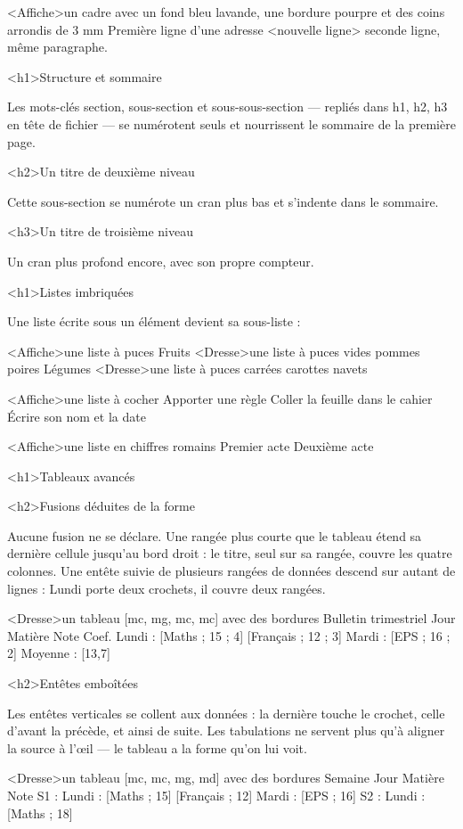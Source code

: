 \documentclass[marges=2, taille=11]{texecole}
\begin{document}
<Affiche>un cadre avec un fond bleu lavande, une bordure pourpre et des coins arrondis de 3 mm {
	Première ligne d'une adresse <nouvelle ligne> seconde ligne, même
	paragraphe.
}

<h1>Structure et sommaire

Les mots-clés section, sous-section et sous-sous-section — repliés dans h1, h2, h3 en tête de fichier — se numérotent seuls et nourrissent le sommaire de la première page.

<h2>Un titre de deuxième niveau

Cette sous-section se numérote un cran plus bas et s'indente dans le sommaire.

<h3>Un titre de troisième niveau

Un cran plus profond encore, avec son propre compteur.

<h1>Listes imbriquées

Une liste écrite sous un élément devient sa sous-liste :

<Affiche>une liste à puces {
	Fruits
	<Dresse>une liste à puces vides {
		pommes
		poires
	}
	Légumes
	<Dresse>une liste à puces carrées {
		carottes
		navets
	}
}

<Affiche>une liste à cocher {
	Apporter une règle
	Coller la feuille dans le cahier
	Écrire son nom et la date
}

<Affiche>une liste en chiffres romains {
	Premier acte
	Deuxième acte
}

<h1>Tableaux avancés

<h2>Fusions déduites de la forme

Aucune fusion ne se déclare. Une rangée plus courte que le tableau étend sa dernière cellule jusqu'au bord droit : le titre, seul sur sa rangée, couvre les quatre colonnes. Une entête suivie de plusieurs rangées de données descend sur autant de lignes : Lundi porte deux crochets, il couvre deux rangées.

<Dresse>un tableau [mc, mg, mc, mc] avec des bordures {
	Bulletin trimestriel
	Jour	Matière	Note	Coef.
	Lundi :	[Maths ; 15 ; 4]
				  [Français ; 12 ; 3]
	Mardi :	[EPS ; 16 ; 2]
	Moyenne :	[13,7]
}

<h2>Entêtes emboîtées

Les entêtes verticales se collent aux données : la dernière touche le crochet, celle d'avant la précède, et ainsi de suite. Les tabulations ne servent plus qu'à aligner la source à l'œil — le tableau a la forme qu'on lui voit.

<Dresse>un tableau [mc, mc, mg, md] avec des bordures {
	Semaine	Jour	Matière	Note
	S1 :	 Lundi :	[Maths ; 15]
								 [Français ; 12]
				Mardi :	[EPS ; 16]
	S2 :	Lundi :	[Maths ; 18]
}
\end{document}

